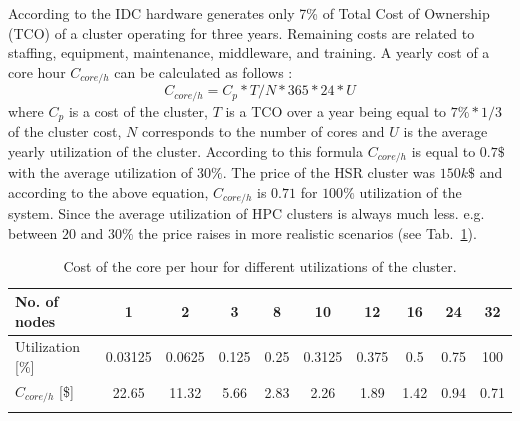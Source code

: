 \documentclass[3p,times]{elsarticle}
\begin{document}
According to the IDC \cite{Perry2007} hardware generates only 7\% of Total Cost of Ownership (TCO) of a cluster operating for three years. Remaining costs are related to staffing, equipment, maintenance, middleware, and training. A yearly cost of a core hour $C_{core/h}$ can be calculated as follows \cite{ubercloud}:
$$ 
C_{core/h} = { C_p * T } / { N * 365 * 24 * U } 
$$
where $C_p$ is a cost of the cluster, $T$ is a TCO over a year being equal to $7\% * 1/3$ of the cluster cost, $N$ corresponds to the number of cores and $U$ is the average yearly utilization of the cluster. According to this formula $C_{core/h}$ is equal to $0.7\$$ with the average utilization of $30\%$. The price of the HSR cluster was $150k\$$ and according to the above equation, $C_{core/h}$ is $0.71$ for $100\%$ utilization of the system. Since the average utilization of HPC clusters is always much less. e.g. between $20$ and $30 \%$ \cite{Delimitrou:2014:QRQ:2541940.2541941} the price raises in more realistic scenarios (see Tab.~\ref{tab:cost}).

\begin{table}[h]
\begin{tabular}{lccccccccc}
\hline
\multicolumn{1}{|l|}{No. of nodes}          & \multicolumn{1}{c|}{1}       & \multicolumn{1}{c|}{2}      & \multicolumn{1}{c|}{3}     & \multicolumn{1}{c|}{8}    & \multicolumn{1}{c|}{10}     & \multicolumn{1}{c|}{12}    & \multicolumn{1}{c|}{16}   & \multicolumn{1}{c|}{24}   & \multicolumn{1}{c|}{32}   \\ \hline
\multicolumn{1}{|l|}{Utilization {[}\%{]}}  & \multicolumn{1}{c|}{0.03125} & \multicolumn{1}{c|}{0.0625} & \multicolumn{1}{c|}{0.125} & \multicolumn{1}{c|}{0.25} & \multicolumn{1}{c|}{0.3125} & \multicolumn{1}{c|}{0.375} & \multicolumn{1}{c|}{0.5}  & \multicolumn{1}{c|}{0.75} & \multicolumn{1}{c|}{100}  \\ \hline
\multicolumn{1}{|l|}{$C_{core/h}$ {[}\${]}} & \multicolumn{1}{c|}{22.65}   & \multicolumn{1}{c|}{11.32}  & \multicolumn{1}{c|}{5.66}  & \multicolumn{1}{c|}{2.83} & \multicolumn{1}{c|}{2.26}   & \multicolumn{1}{c|}{1.89}  & \multicolumn{1}{c|}{1.42} & \multicolumn{1}{c|}{0.94} & \multicolumn{1}{c|}{0.71} \\ \hline
                                            & \multicolumn{1}{l}{}         & \multicolumn{1}{l}{}        & \multicolumn{1}{l}{}       & \multicolumn{1}{l}{}      & \multicolumn{1}{l}{}        & \multicolumn{1}{l}{}       & \multicolumn{1}{l}{}      & \multicolumn{1}{l}{}      & \multicolumn{1}{l}{}     
\end{tabular}
\label{tab:cost}
\caption{Cost of the core per hour for different utilizations of the cluster. }
\end{table}
\end{document}
